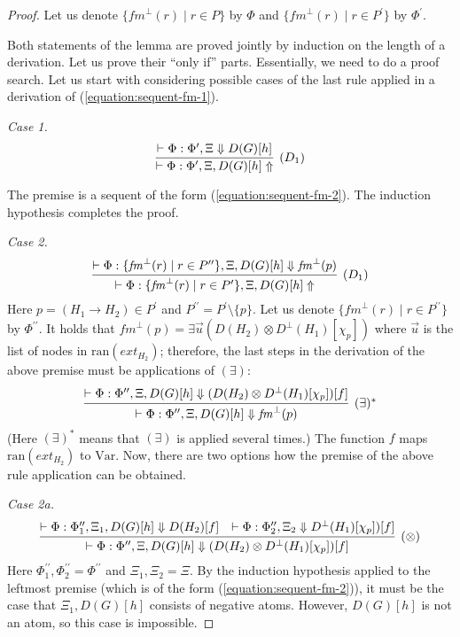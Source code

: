\documentclass[a4paper,UKenglish,cleveref, autoref, thm-restate,pdfa]{lipics-v2021}
\newcommand{\ran}{\mathrm{ran}}
\newcommand{\ext}{\mathit{ext}}
\newcommand{\Var}{\mathrm{Var}}
\newcommand{\mconj}{\otimes}
\newcommand{\fm}{\mathit{fm}}
\begin{document}
\begin{proof}
	Let us denote $\{\fm^\bot(r) \mid r \in P\}$ by $\Phi$ and $\{\fm^\bot(r) \mid r \in P^\prime\}$ by $\Phi^\prime$.
	
	Both statements of the lemma are proved jointly by induction on the length of a derivation. Let us prove their ``only if'' parts. Essentially, we need to do a proof search. Let us start with considering possible cases of the last rule applied in a derivation of (\ref{equation:sequent-fm-1}).
	
	\textit{Case 1.}
	$$
	\infer[(D_1)]
	{
		\vdash \Phi : \Phi^\prime, \Xi, D(G)[h] \Uparrow
	}
	{
		\vdash \Phi : \Phi^\prime, \Xi \Downarrow D(G)[h]
	}
	$$
	
	The premise is a sequent of the form (\ref{equation:sequent-fm-2}). The induction hypothesis completes the proof.
	
	\textit{Case 2.}
	$$
	\infer[(D_1)]
	{	\vdash \Phi : \{\fm^\bot(r) \mid r \in P^\prime\}, \Xi, D(G)[h] \Uparrow	}
	{	\vdash \Phi : \{\fm^\bot(r) \mid r \in P^{\prime\prime}\}, \Xi, D(G)[h] \Downarrow \fm^\bot(p)		}
	$$
	Here $p = (H_1 \to H_2) \in P^\prime$ and $P^{\prime\prime} = P^\prime \setminus \{p\}$. Let us denote $\{\fm^\bot(r) \mid r \in P^{\prime\prime}\}$ by $\Phi^{\prime\prime}$. It holds that $\fm^\bot(p) = \exists \vec{u} (D(H_2) \mconj D^\bot(H_1)[\chi_p])$ where $\vec{u}$ is the list of nodes in $\ran(\ext_{H_2})$; therefore, the last steps in the derivation of the above premise must be applications of $(\exists)$:
	$$
	\infer[(\exists)^\ast]
	{	\vdash \Phi : \Phi^{\prime\prime}, \Xi, D(G)[h] \Downarrow \fm^\bot(p)		}
	{	\vdash \Phi : \Phi^{\prime\prime}, \Xi, D(G)[h] \Downarrow (D(H_2) \mconj D^\bot(H_1)[\chi_p])[f]	}
	$$
	(Here $(\exists)^\ast$ means that $(\exists)$ is applied several times.) The function $f$ maps $\ran(\ext_{H_2})$ to $\Var$. Now, there are two options how the premise of the above rule application can be obtained.
	
	\textit{Case 2a.}
	$$
	\infer[(\mconj)]
	{	\vdash \Phi : \Phi^{\prime\prime}, \Xi, D(G)[h] \Downarrow (D(H_2) \mconj D^\bot(H_1)[\chi_p])[f]	}
	{	\vdash \Phi : \Phi^{\prime\prime}_1, \Xi_1, D(G)[h] \Downarrow D(H_2)[f] 
		&
		\vdash \Phi : \Phi^{\prime\prime}_2, \Xi_2 \Downarrow D^\bot(H_1)[\chi_p])[f]	}
	$$
	Here $\Phi_1^{\prime\prime},\Phi_2^{\prime\prime}=\Phi^{\prime\prime}$ and $\Xi_1,\Xi_2=\Xi$. By the induction hypothesis applied to the leftmost premise (which is of the form (\ref{equation:sequent-fm-2})), it must be the case that $\Xi_1, D(G)[h]$ consists of negative atoms. However, $D(G)[h]$ is not an atom, so this case is impossible. 
	

\end{proof}
\end{document}
